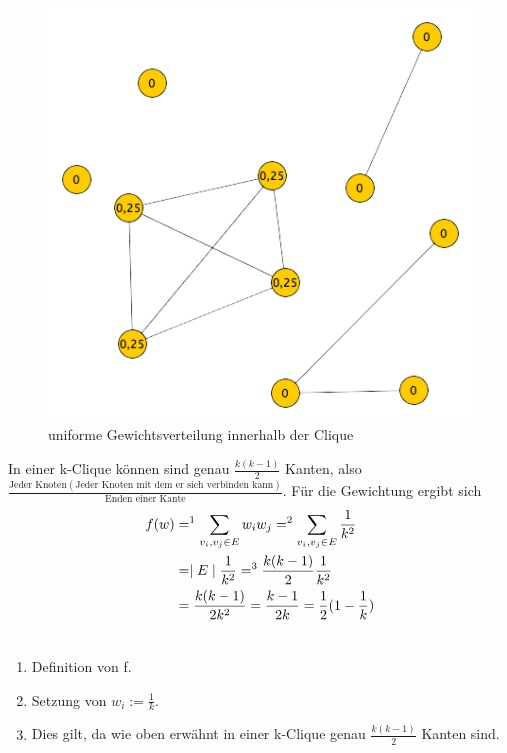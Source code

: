 \documentclass[12pt, a4paper]{article}
\begin{document}
\begin{figure}[H] 
		\centering
		\includegraphics[page=1, width=\textwidth]{assets/proof3_after_second_moving_step}
		\caption{uniforme Gewichtsverteilung innerhalb der Clique} 
\end{figure}
\newpage

In einer k-Clique können sind genau $\frac{k (k-1)}{2}$ Kanten, also \\
 $\frac{\text{Jeder Knoten} (\text{Jeder Knoten mit dem er sich verbinden kann})}{\text{Enden einer Kante}}$. Für die Gewichtung ergibt sich 
\begin{gather}
\begin{split}f(w) &=^1 \sum_{v_i, v_j \in E} w_i w_j =^2 \sum_{v_i, v_j \in E} \frac{1}{k^2}  \\
&= \mid E \mid \frac{1}{k^2} =^3 \frac{k (k-1)}{2} \frac{1}{k^2}  \\
&= \frac{k (k-1)}{2k^2} = \frac{k-1}{2k} = \frac{1}{2} (1 - \frac{1}{k})\end{split}\notag\\\begin{split}\end{split}\notag
\end{gather}\begin{enumerate}
\item {}
Definition von f.

\item {}
Setzung von $w_i := \frac{1}{k}$.

\item {}
Dies gilt, da wie oben erwähnt in einer k-Clique genau $\frac{k (k-1)}{2}$ Kanten sind.

\end{enumerate}
\end{document}
